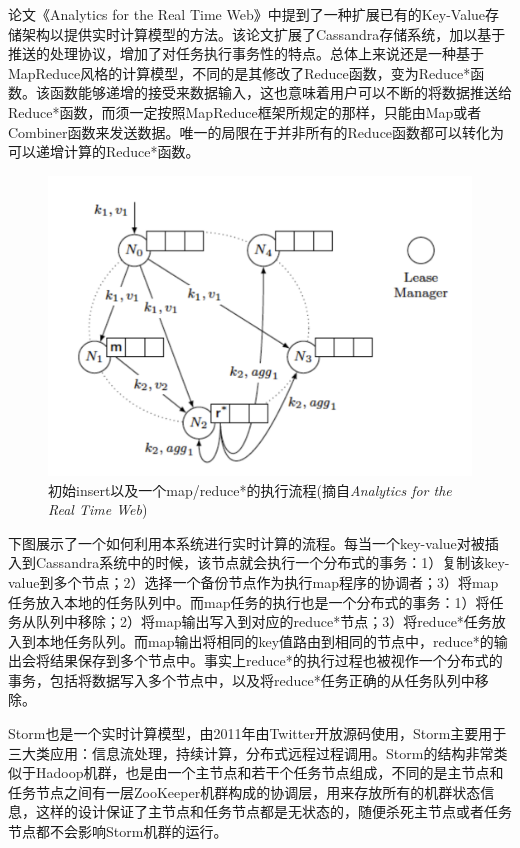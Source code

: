   论文《Analytics for the Real Time Web》中提到了一种扩展已有的Key-Value存储架构以提供实时计算模型的方法。该论文扩展了Cassandra存储系统，加以基于推送的处理协议，增加了对任务执行事务性的特点。总体上来说还是一种基于MapReduce风格的计算模型，不同的是其修改了Reduce函数，变为Reduce*函数。该函数能够递增的接受来数据输入，这也意味着用户可以不断的将数据推送给Reduce*函数，而须一定按照MapReduce框架所规定的那样，只能由Map或者Combiner函数来发送数据。唯一的局限在于并非所有的Reduce函数都可以转化为可以递增计算的Reduce*函数。

\begin{figure}[]
\centering
\includegraphics[width=5in]{../figures/realtimep.pdf}
\caption{初始insert以及一个map/reduce*的执行流程(摘自\textit{Analytics for the Real Time Web})}
\label{fig:realtimep}
\end{figure}

  下图展示了一个如何利用本系统进行实时计算的流程。每当一个key-value对被插入到Cassandra系统中的时候，该节点就会执行一个分布式的事务：1）复制该key-value到多个节点；2）选择一个备份节点作为执行map程序的协调者；3）将map任务放入本地的任务队列中。而map任务的执行也是一个分布式的事务：1）将任务从队列中移除；2）将map输出写入到对应的reduce*节点；3）将reduce*任务放入到本地任务队列。而map输出将相同的key值路由到相同的节点中，reduce*的输出会将结果保存到多个节点中。事实上reduce*的执行过程也被视作一个分布式的事务，包括将数据写入多个节点中，以及将reduce*任务正确的从任务队列中移除。

          

Storm也是一个实时计算模型，由2011年由Twitter开放源码使用，Storm主要用于三大类应用：信息流处理，持续计算，分布式远程过程调用。Storm的结构非常类似于Hadoop机群，也是由一个主节点和若干个任务节点组成，不同的是主节点和任务节点之间有一层ZooKeeper机群构成的协调层，用来存放所有的机群状态信息，这样的设计保证了主节点和任务节点都是无状态的，随便杀死主节点或者任务节点都不会影响Storm机群的运行。


